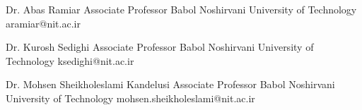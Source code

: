 
\vspace{5pt}

\begin{referees}\label{supervisor}
  {Dr. Abas Ramiar}
  {Associate Professor}
  {Babol Noshirvani University of Technology}
  {aramiar@nit.ac.ir}
  {}

  {Dr. Kurosh Sedighi}
  {Associate Professor}
  {Babol Noshirvani University of Technology}
  {ksedighi@nit.ac.ir}
  {}

  {Dr. Mohsen Sheikholeslami Kandelusi}
  {Associate Professor}
  {Babol Noshirvani University of Technology}
  {mohsen.sheikholeslami@nit.ac.ir}
  {}
\end{referees}
